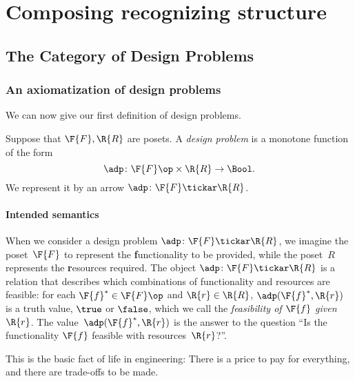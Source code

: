 \section{Composing recognizing structure}
\subsection{The Category of Design Problems}
\subsubsection{An axiomatization of design problems}
We can now give our first definition of design problems.

\begin{definition} \label{def:design-problem}
Suppose that $\F{F}, \R{R}$ are posets. A \emph{design problem} is a monotone function of the form
\begin{equation}
	\adp \colon  \F{F}\op \times \R{R} \to \Bool.
\end{equation}
We represent it by an arrow $\adp \colon \F{F} \tickar \R{R}$.
\end{definition}

\paragraph{Intended semantics}

When we consider a design problem $\adp\colon \F{F} \tickar \R{R}$, we imagine the poset~$\F{F}$ to represent the \textbf{f}unctionality to be provided, while the poset~$R$ represents the \textbf{r}esources required. The object $\adp \colon \F{F} \tickar \R{R}$ is a relation that describes which combinations of functionality and resources are feasible: for each $\F{f}^* \in \F{F}\op$ and $\R{r} \in \R{R}$, $\adp(\F{f}^*,\R{r})$ is a truth value, $\true$ or $\false$, which we call the \emph{feasibility of $\F{f}$ given $\R{r}$}. The value~$\adp(\F{f}^*,\R{r})$ is the answer to the question ``Is the functionality $\F{f}$ feasible with resources~$\R{r}$?''.

This is the basic fact of life in engineering: There is a price to pay for everything, and there are trade-offs to be made.


